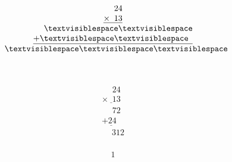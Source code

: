 \begin{minipage}[t]{0.3\linewidth}
\begin{align*}\begin{array}{c}
\phantom{
\times0
}
24\\
\underline{
\times
\phantom{
0
}
13
}\\
\phantom{
+0
}
\textvisiblespace
\textvisiblespace
\\
\underline{
+
\textvisiblespace
\textvisiblespace
\phantom0
}
\\
\phantom{+}
\textvisiblespace
\textvisiblespace
\textvisiblespace
\end{array}\end{align*}
\end{minipage}
\begin{minipage}[t]{0.05\linewidth}
\begin{align*}\begin{array}{c}
\textvisiblespace
\end{array}\end{align*}
\end{minipage}
\begin{minipage}[t]{0.3\linewidth}
\begin{align*}\begin{array}{c}
\phantom{
\times0
}
24\\
\underline{
\times
\phantom{
0
}
13
}\\
\phantom{
+0
}
72
\\
\underline{
+
24
\phantom0
}
\\
\phantom{+}
312
\end{array}\end{align*}
\end{minipage}
\begin{minipage}[t]{0.05\linewidth}
\begin{align*}\begin{array}{c}
1
\end{array}\end{align*}
\end{minipage}

